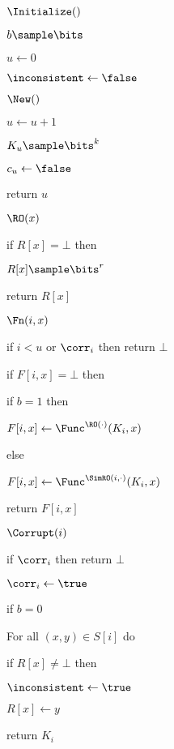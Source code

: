 \begin{figure}[t]
	\begin{minipage}[t]{3.5cm}
		
		\begin{oracle*}{$\Initialize()$}
			\item $b \sample \bits$
			\item $u \gets 0$
			\item $\inconsistent \gets \false$
		\end{oracle*}
		
		\begin{oracle*}{$\New()$}
			\item $u \gets u + 1$
			\item $K_u \sample \bits^k$
			\item $c_u \gets \false$
			\item return $u$
		\end{oracle*}
		
		\begin{oracle}{$\RO(x)$}
			\item if $R[x] = \bot$ then
			\item \hindent $R[x] \sample \bits^r$
			\item return $R[x]$
		\end{oracle}
	\end{minipage}
	\begin{minipage}[t]{5cm}
		\begin{oracle*}{$\Fn(i, x)$}
			\item if $i < u$ or $\corr_i$ then return $\bot$
			
			\item if $F[i, x] = \bot$ then
			
			\item \hindent if $b = 1$ then
			\item \hindent \hindent $F[i, x] \gets \Func^{\RO(\cdot)}(K_i, x)$
			
			\item \hindent else
			\item \hindent \hindent $F[i, x] \gets \Func^{\SimRO(i, \cdot)}(K_i, x)$
			
			\item return $F[i, x]$
		\end{oracle*}
		
		\begin{oracle*}{$\Corrupt(i)$}
			\item if $\corr_i$ then return $\bot$
			\item $\corr_i \gets \true$
			\item if $b = 0$
			\item \hindent For all $(x, y) \in S[i]$ do
			\item \hindent \hindent if $R[x] \neq \bot$ then
			\item \hindent \hindent \hindent $\inconsistent \gets \true$
			\item \hindent \hindent $R[x] \gets y$  
			\item return $K_i$
		\end{oracle*}
		

\end{minipage}
\end{figure}
